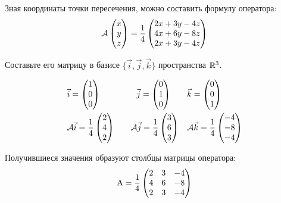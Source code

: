 Зная координаты точки пересечения, можно составить формулу оператора:\\
\[
  \mathcal{A}
  \begin{pmatrix}
        x \\ y \\ z
  \end{pmatrix}
  = \frac{1}{4}
  \begin{pmatrix}
        2x + 3y - 4z \\
        4x + 6y - 8z \\
        2x + 3y - 4z
  \end{pmatrix}
\]

Составьте его матрицу в базисе \(\{\vec{i}, \vec{j}, \vec{k}\}\)
пространства \(\mathbb{R}^3\).

\[
\begin{aligned}
  &\vec{i} = \begin{pmatrix} 1 \\ 0 \\ 0 \end{pmatrix} \qquad
  &\vec{j} = \begin{pmatrix} 0 \\ 1 \\ 0 \end{pmatrix} \qquad
  &\vec{k} = \begin{pmatrix} 0 \\ 0 \\ 1 \end{pmatrix} \\
  &\mathcal{A}\vec{i} = \frac{1}{4}\begin{pmatrix} 2 \\ 4 \\ 2 \end{pmatrix} \quad
  &\mathcal{A}\vec{j} = \frac{1}{4}\begin{pmatrix} 3 \\ 6 \\ 3 \end{pmatrix} \quad
  &\mathcal{A}\vec{k} = \frac{1}{4}\begin{pmatrix} -4 \\ -8 \\ -4 \end{pmatrix}
\end{aligned}
\]

Получившиеся значения образуют столбцы матрицы оператора:
\begin{align*}
  \mathrm{A} = \frac{1}{4}
  \begin{pmatrix}
    2 & 3 & -4 \\
    4 & 6 & -8 \\
    2 & 3 & -4
  \end{pmatrix}
\end{align*}

